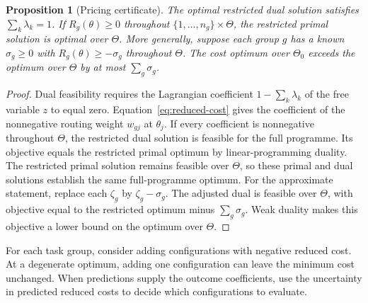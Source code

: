 \documentclass[11pt,reqno]{amsart}
\newtheorem{proposition}[theorem]{Proposition}
\theoremstyle{definition}
\theoremstyle{remark}
\begin{document}
\begin{proposition}[Pricing certificate]\label{prop:pricing}
The optimal restricted dual solution satisfies $\sum_k\lambda_k=1$.
If $R_g(\theta)\ge0$ throughout $\{1,\ldots,n_g\}\times\Theta$, the restricted primal solution is optimal over $\Theta$.
More generally, suppose each group $g$ has a known $\sigma_g\ge0$ with $R_g(\theta)\ge-\sigma_g$ throughout $\Theta$.
The cost optimum over $\Theta_0$ exceeds the optimum over $\Theta$ by at most $\sum_g\sigma_g$.
\end{proposition}
\begin{proof}
Dual feasibility requires the Lagrangian coefficient $1-\sum_k\lambda_k$ of the free variable $z$ to equal zero.
Equation~\eqref{eq:reduced-cost} gives the coefficient of the nonnegative routing weight $w_{gj}$ at $\theta_j$.
If every coefficient is nonnegative throughout $\Theta$, the restricted dual solution is feasible for the full programme. Its objective equals the restricted primal optimum by linear-programming duality. The restricted primal solution remains feasible over $\Theta$, so these primal and dual solutions establish the same full-programme optimum.
For the approximate statement, replace each $\zeta_g$ by $\zeta_g-\sigma_g$.
The adjusted dual is feasible over $\Theta$, with objective equal to the restricted optimum minus $\sum_g\sigma_g$. Weak duality makes this objective a lower bound on the optimum over $\Theta$.
\end{proof}

For each task group, consider adding configurations with negative reduced cost. At a degenerate optimum, adding one configuration can leave the minimum cost unchanged. When predictions supply the outcome coefficients, use the uncertainty in predicted reduced costs to decide which configurations to evaluate.
\end{document}
